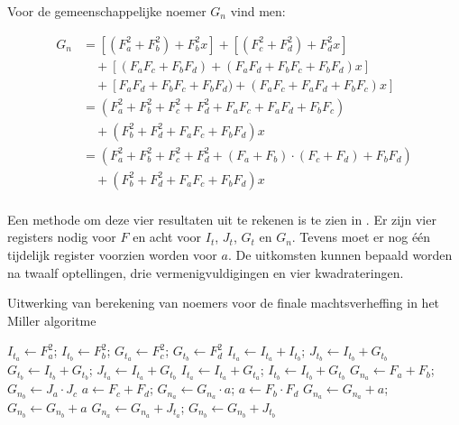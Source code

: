 Voor de gemeenschappelijke noemer $G_n$ vind men:

\[\begin{aligned}
G_n	&= [(F_a^2 + F_b^2) + F_b^2 x] + [(F_c^2 + F_d^2) + F_d^2x]\\
			&\quad + [(F_a F_c + F_b F_d) + (F_a F_d + F_b F_c + F_b F_d)x]\\
			&\quad + [F_a F_d + F_b F_c + F_b F_d) + (F_a F_c + F_a F_d + F_b F_c)x]\\
		&= (F_a^2 + F_b^2 + F_c^2 + F_d^2 + F_a F_c + F_a F_d + F_b F_c)\\
			&\quad + (F_b^2 + F_d^2 + F_a F_c + F_b F_d)x\\
		&= (F_a^2 + F_b^2 + F_c^2 + F_d^2 + (F_a + F_b) \cdot (F_c + F_d) + F_b F_d)\\
			&\quad + (F_b^2 + F_d^2 + F_a F_c + F_b F_d)x\\
\end{aligned}\]

Een methode om deze vier resultaten uit te rekenen is te zien in . Er zijn vier registers nodig voor $F$ en acht voor $I_t$, $J_t$, $G_t$ en $G_n$. Tevens moet er nog \'e\'en tijdelijk register voorzien worden voor $a$. De uitkomsten kunnen bepaald worden na twaalf optellingen, drie vermenigvuldigingen en vier kwadrateringen.

\begin{algorithm}[h]
	\caption{Uitwerking van berekening van noemers voor de finale machtsverheffing in het Miller algoritme}
	\label{algoritme-implementatie-miller-final-noemers}
	$I_{t_a} \leftarrow F_a^2$; $I_{t_b} \leftarrow F_b^2$; $G_{t_a} \leftarrow F_c^2$; $G_{t_b} \leftarrow F_d^2$\;
	$I_{t_a} \leftarrow I_{t_a} + I_{t_b}$; $J_{t_b} \leftarrow I_{t_b} + G_{t_b}$\;
	$G_{t_b} \leftarrow I_{t_b} + G_{t_b}$; $J_{t_a} \leftarrow I_{t_a} + G_{t_b}$\;
	$I_{t_a} \leftarrow I_{t_a} + G_{t_a}$; $I_{t_b} \leftarrow I_{t_b} + G_{t_b}$\;
	$G_{n_a} \leftarrow F_a + F_b$; $G_{n_b} \leftarrow J_a \cdot J_c$\;
	$a \leftarrow F_c + F_d$; $G_{n_a} \leftarrow G_{n_a} \cdot a$; $a \leftarrow F_b \cdot F_d$\;
	$G_{n_a} \leftarrow G_{n_a} + a$; $G_{n_b} \leftarrow G_{n_b} + a$\;
	$G_{n_a} \leftarrow G_{n_a} + J_{t_a}$; $G_{n_b} \leftarrow G_{n_b} + J_{t_b}$\;
\end{algorithm}

